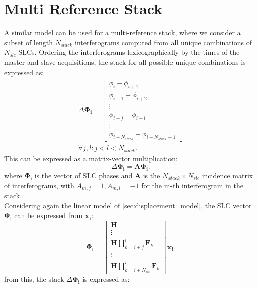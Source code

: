 \documentclass{article}
\begin{document}
\section{Multi Reference Stack}
A similar model can be used for a multi-reference stack, where we consider a subset of length $N_{stack}$ interferograms  computed from all unique combinations of $N_{slc}$ SLCs. Ordering the interferograms lexicographically by the times of the master and slave acquisitions, the stack for all possible unique combinations is expressed as:
\begin{equation}\label{eq:stack}
	\begin{aligned}
			 \Delta\mathbf{\Phi_{i}} =
		\begin{bmatrix}
			\phi_{i} - \phi_{i+1}\\
			\phi_{i+1} - \phi_{i+2}\\
			\vdots\\
			\phi_{i+j} - \phi_{i+l}\\
			\vdots\\
			\phi_{i+N_{stack}} - \phi_{i+N_{stack} - 1}
		\end{bmatrix}\\
		\forall j,l : j < l < N_{stack}.
		\end{aligned}
\end{equation}
This can be expressed as a matrix-vector multiplication:
\begin{equation}
	 \Delta\mathbf{\Phi_{i}} = \mathbf{A} \mathbf{\Phi_{i}}.
\end{equation}
where $\mathbf{\Phi_{i}}$ is the vector of SLC phases and $\mathbf{A}$ is the $N_{stack}\times N_{slc}$ incidence matrix of interferograms, with $A_{m,j} = 1, A_{m,l}=-1$ for the m-th interferogram in the stack\cite{Agram2015}.\\
Considering again the linear model of \autoref{sec:displacement_model}, the SLC vector  $\mathbf{\Phi_{i}}$ can be expressed from $\mathbf{x_i}$:
\begin{equation}
	 \mathbf{\Phi_{i}} = 
	 \begin{bmatrix}
	 	\mathbf{H}\\
	 	\vdots\\
	 	\mathbf{H} \prod_{k=i+j}^{i}\mathbf{F}_k\\
	 	\vdots\\
	 	\mathbf{H} \prod_{k=i+N_{slc}}^{i}\mathbf{F}_k
	 \end{bmatrix} \mathbf{x_i}.
\end{equation}
from this, the stack $\Delta\mathbf{\Phi_{i}}$ is expressed as:
\end{document}
